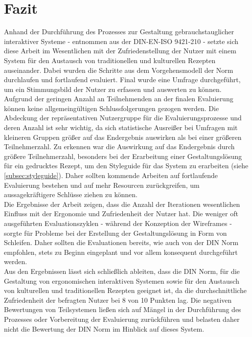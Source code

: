\chapter{Fazit}
\label{cha:Fazit}
Anhand der Durchführung des Prozesses zur Gestaltung gebrauchstauglicher interaktiver Systeme - entnommen aus der DIN-EN-ISO 9421-210 \citep{DINISO_2010} - setzte sich diese Arbeit im Wesentlichen mit der Zufriedenstellung der Nutzer mit einem System für den Austausch von traditionellen und kulturellen Rezepten auseinander. Dabei wurden die Schritte aus dem Vorgehensmodell der Norm durchlaufen und fortlaufend evaluiert. Final wurde eine Umfrage durchgeführt, um ein Stimmungsbild der Nutzer zu erfassen und auswerten zu können. \\

Aufgrund der geringen Anzahl an Teilnehmenden an der finalen Evaluierung können keine allgemeingültigen Schlussfolgerungen gezogen werden.
Die Abdeckung der repräsentativen Nutzergruppe für die Evaluierungsprozesse und deren Anzahl ist sehr wichtig, da sich statistische Ausreißer bei Umfragen mit kleineren Gruppen größer auf das Endergebnis auswirken als bei einer größeren Teilnehmerzahl. 
Zu erkennen war die Auswirkung auf das Endergebnis durch größere Teilnehmerzahl, besonders bei der Erarbeitung einer Gestaltungslösung für ein gedrucktes Rezept, um den Styleguide für das System zu erarbeiten (siehe \ref{subsec:styleguide}). Daher sollten kommende Arbeiten auf fortlaufende Evaluierung bestehen und auf mehr Resourcen zurückgreifen, um aussagekräftigere Schlüsse ziehen zu können. \\

Die Ergebnisse der Arbeit zeigen, dass die Anzahl der Iterationen wesentlichen Einfluss mit der Ergonomie und Zufriedenheit der Nutzer hat. Die weniger oft ausgeführten Evaluationszyklen - während der Konzeption der Wireframes - sorgte für Probleme bei der Erstellung der Gestaltungslösung in Form von Schleifen. Daher sollten die Evaluationen bereits, wie auch von der DIN Norm empfohlen, stets zu Beginn eingeplant und vor allem konsequent durchgeführt werden. \\

Aus den Ergebnissen lässt sich schließlich ableiten, dass die DIN Norm, für die Gestaltung von ergonomischen interaktiven Systemen sowie für den Austausch von kulturellen und traditionellen Rezepten geeignet ist, da die durchschnittliche Zufriedenheit der befragten Nutzer bei 8 von 10 Punkten lag. Die negativen Bewertungen von Teilsystemen ließen sich auf Mängel in der Durchführung des Prozesses oder Vorbereitung der Evaluierung zurückführen und belasten daher nicht die Bewertung der DIN Norm im Hinblick auf dieses System. \\

